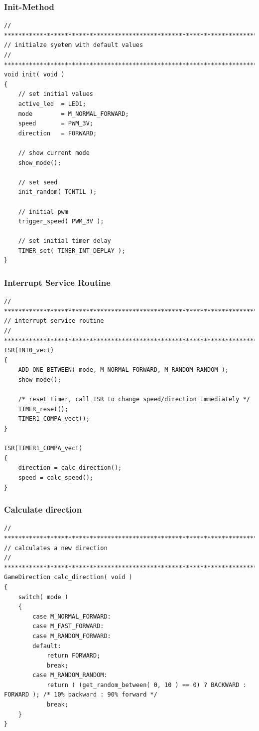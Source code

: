 \subsubsection{Init-Method}
\begin{lstlisting}[caption={Init-Method},label=lst:init]
// ****************************************************************************
// initialze syetem with default values
// ***************************************************************************/
void init( void )
{
	// set initial values
	active_led  = LED1;
	mode        = M_NORMAL_FORWARD;
	speed       = PWM_3V;
	direction   = FORWARD;

	// show current mode
	show_mode();

	// set seed
	init_random( TCNT1L );

	// initial pwm
	trigger_speed( PWM_3V );

	// set initial timer delay
	TIMER_set( TIMER_INT_DEPLAY );
}
\end{lstlisting}
\vspace{0.5cm}

\subsubsection{Interrupt Service Routine}
\begin{lstlisting}[caption={Interrupt Service Routine},label=lst:isr]
// ****************************************************************************
// interrupt service routine
// ***************************************************************************/
ISR(INT0_vect)
{
	ADD_ONE_BETWEEN( mode, M_NORMAL_FORWARD, M_RANDOM_RANDOM );
	show_mode();

	/* reset timer, call ISR to change speed/direction immediately */
	TIMER_reset();
	TIMER1_COMPA_vect();
}

ISR(TIMER1_COMPA_vect)
{
	direction = calc_direction();
	speed = calc_speed();
}
\end{lstlisting}
\vspace{0.5cm}

\subsubsection{Calculate direction}
\begin{lstlisting}[caption={Calculate direction},label=lst:calcdirection]
// ****************************************************************************
// calculates a new direction
// ***************************************************************************/
GameDirection calc_direction( void )
{
	switch( mode )
	{
		case M_NORMAL_FORWARD:
		case M_FAST_FORWARD:
		case M_RANDOM_FORWARD:
		default:
			return FORWARD;
			break;
		case M_RANDOM_RANDOM:
			return ( (get_random_between( 0, 10 ) == 0) ? BACKWARD : FORWARD ); /* 10% backward : 90% forward */
			break;
	}
}
\end{lstlisting}
\vspace{0.5cm}

